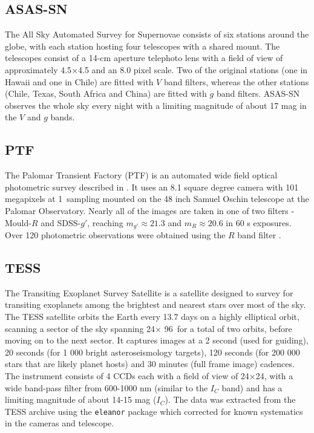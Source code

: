 \documentclass{aa}
\begin{document}
\subsection{ASAS-SN}

The All Sky Automated Survey for Supernovae \citep[ASAS-SN; ][]{shappee_man_2014,kochanek_all-sky_2017} consists of six stations around the globe, with each station hosting four telescopes with a shared mount.
%
The telescopes consist of a 14-cm aperture telephoto lens with a field of view of approximately 4.5\degr{}$\times$4.5\degr{} and an 8.0\arcsec{} pixel scale.
% 
Two of the original stations (one in Hawaii and one in Chile) are fitted with $V$ band filters, whereas the other stations (Chile, Texas, South Africa and China) are fitted with $g$ band filters.
%
ASAS-SN observes the whole sky every night with a limiting magnitude of about 17 mag in the $V$ and $g$ bands.
%

\subsection{PTF}

The Palomar Transient Factory (PTF) is an automated wide field optical photometric survey described in \citet{Law09}.
%
It uses an 8.1 square degree camera with 101 megapixels at  1\arcsec\ sampling mounted on the 48 inch Samuel Oschin telescope at the Palomar Observatory.
%
Nearly all of the images are taken in one of two filters - Mould-$R$ and SDSS-$g'$, reaching $m_{g'}\approx 21.3$ and $m_R \approx 20.6$ in 60 s exposures.
%
Over 120 photometric observations were obtained using the $R$ band filter \citep{Ofek12}.

\subsection{TESS}

The Transiting Exoplanet Survey Satellite \citep[TESS; ][]{2015JATIS...1a4003R} is a satellite designed to survey for transiting exoplanets among the brightest and nearest stars over most of the sky.
%
The TESS satellite orbits the Earth every 13.7 days on a highly elliptical orbit, scanning a sector of the sky spanning 24\degr $\times$ 96\degr\ for a total of two orbits, before moving on to the next sector. 
%
It captures images at a 2 second (used for guiding), 20 seconds (for 1 000 bright asteroseismology targets), 120 seconds (for 200 000 stars that are likely planet hosts) and 30 minutes (full frame image) cadences.
%
The instrument consists of 4 CCDs each with a field of view of 24\degr$\times$24\degr, with a wide band-pass filter from 600-1000 nm (similar to the $I_C$ band) and has a limiting magnitude of about 14-15 mag ($I_C$).
%
The data was extracted from the TESS archive using the {\tt eleanor} package \citep{Feinstein19} which corrected for known systematics in the cameras and telescope.
\end{document}
